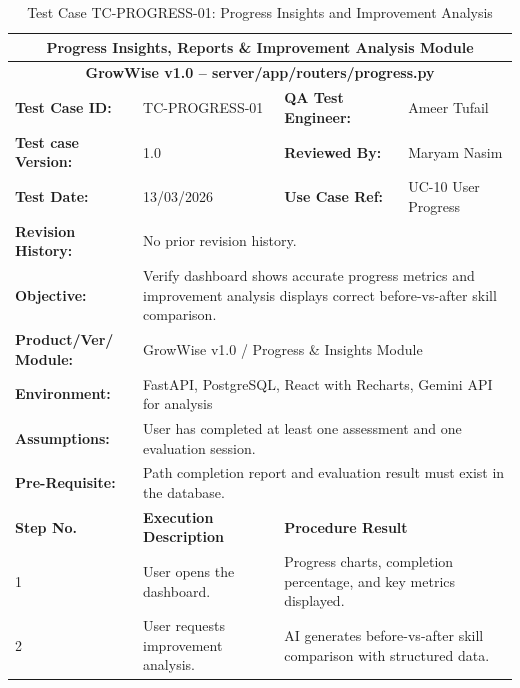\documentclass{FastFyp}
\begin{document}
\begin{table}[H]
\footnotesize
\centering
\caption{Test Case TC-PROGRESS-01: Progress Insights and Improvement Analysis}
\label{tab:tcprogress}
\begin{tabular}{|p{2.5cm}|p{4cm}|p{2.5cm}|p{4.5cm}|}
\hline
\multicolumn{4}{|c|}{\textbf{Progress Insights, Reports \& Improvement Analysis Module}} \\ \hline
\multicolumn{4}{|c|}{\textbf{GrowWise v1.0 -- server/app/routers/progress.py}} \\ \hline
\textbf{Test Case ID:} & TC-PROGRESS-01 & \textbf{QA Test Engineer:} & Ameer Tufail \\ \hline
\textbf{Test case Version:} & 1.0 & \textbf{Reviewed By:} & Maryam Nasim \\ \hline
\textbf{Test Date:} & 13/03/2026 & \textbf{Use Case Ref:} & UC-10 User Progress \\ \hline
\textbf{Revision History:} & \multicolumn{3}{p{11cm}|}{No prior revision history.} \\ \hline
\textbf{Objective:} & \multicolumn{3}{p{11cm}|}{Verify dashboard shows accurate progress metrics and improvement analysis displays correct before-vs-after skill comparison.} \\ \hline
\textbf{Product/Ver/ Module:} & \multicolumn{3}{p{11cm}|}{GrowWise v1.0 / Progress \& Insights Module} \\ \hline
\textbf{Environment:} & \multicolumn{3}{p{11cm}|}{FastAPI, PostgreSQL, React with Recharts, Gemini API for analysis} \\ \hline
\textbf{Assumptions:} & \multicolumn{3}{p{11cm}|}{User has completed at least one assessment and one evaluation session.} \\ \hline
\textbf{Pre-Requisite:} & \multicolumn{3}{p{11cm}|}{Path completion report and evaluation result must exist in the database.} \\ \hline
\textbf{Step No.} & \textbf{Execution Description} & \multicolumn{2}{p{7cm}|}{\textbf{Procedure Result}} \\ \hline
1 & User opens the dashboard. & \multicolumn{2}{p{7cm}|}{Progress charts, completion percentage, and key metrics displayed.} \\ \hline
2 & User requests improvement analysis. & \multicolumn{2}{p{7cm}|}{AI generates before-vs-after skill comparison with structured data.} \\ \hline

\end{tabular}
\end{table}
\end{document}
